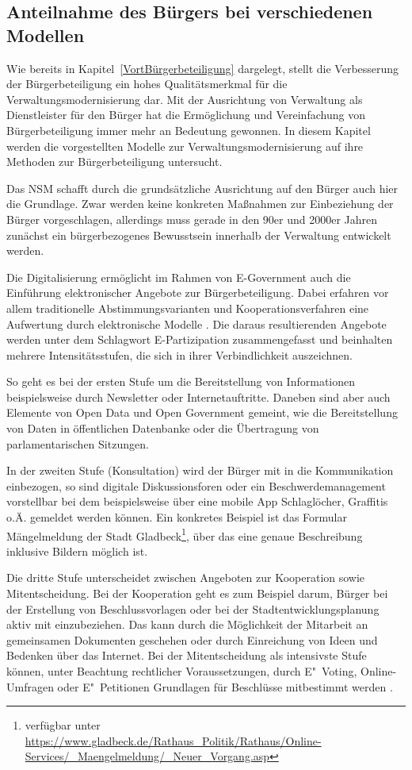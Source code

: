 \subsection{Anteilnahme des Bürgers bei verschiedenen Modellen}
Wie bereits in Kapitel~\ref{VortBürgerbeteiligung} dargelegt, stellt die Verbesserung der Bürgerbeteiligung ein hohes Qualitätsmerkmal für die Verwaltungsmodernisierung dar.
Mit der Ausrichtung von Verwaltung als Dienstleister für den Bürger hat die Ermöglichung und Vereinfachung von Bürgerbeteiligung immer mehr an Bedeutung gewonnen.
In diesem Kapitel werden die vorgestellten Modelle zur Verwaltungsmodernisierung auf ihre Methoden zur Bürgerbeteiligung untersucht.

Das NSM schafft durch die grundsätzliche Ausrichtung auf den Bürger auch hier die Grundlage.
Zwar werden keine konkreten Maßnahmen zur Einbeziehung der Bürger vorgeschlagen, allerdings muss gerade in den 90er und 2000er Jahren zunächst ein bürgerbezogenes Bewusstsein innerhalb der Verwaltung entwickelt werden.

Die Digitalisierung ermöglicht im Rahmen von E-Government auch die Einführung elektronischer Angebote zur Bürgerbeteiligung.
Dabei erfahren vor allem traditionelle Abstimmungsvarianten und Kooperationsverfahren eine Aufwertung durch elektronische Modelle \citep[][]{Leitner2018}.
Die daraus resultierenden Angebote werden unter dem Schlagwort E-Partizipation zusammengefasst und beinhalten mehrere Intensitätsstufen, die sich in ihrer Verbindlichkeit auszeichnen.

So geht es bei der ersten Stufe um die Bereitstellung von Informationen beispielsweise durch Newsletter oder Internetauftritte. 
Daneben sind aber auch Elemente von Open Data und Open Government gemeint, wie die Bereitstellung von Daten in öffentlichen Datenbanke oder die Übertragung von parlamentarischen Sitzungen.

In der zweiten Stufe (Konsultation) wird der Bürger mit in die Kommunikation einbezogen, so sind digitale Diskussionsforen oder ein Beschwerdemanagement vorstellbar bei dem beispielsweise über eine mobile App Schlaglöcher, Graffitis o.Ä. gemeldet werden können.
Ein konkretes Beispiel ist das Formular \glqq{}Mängelmeldung\grqq{} der Stadt Gladbeck\footnote{verfügbar unter\\ \url{https://www.gladbeck.de/Rathaus_Politik/Rathaus/Online-Services/_Maengelmeldung/_Neuer_Vorgang.asp}}, über das eine genaue Beschreibung inklusive Bildern möglich ist.

Die dritte Stufe unterscheidet zwischen Angeboten zur Kooperation sowie Mitentscheidung.
Bei der Kooperation geht es zum Beispiel darum, Bürger bei der Erstellung von Beschlussvorlagen oder bei der Stadtentwicklungsplanung aktiv mit einzubeziehen.
Das kann durch die Möglichkeit der Mitarbeit an gemeinsamen Dokumenten geschehen oder durch Einreichung von Ideen und Bedenken über das Internet. 
Bei der Mitentscheidung als intensivste Stufe können, unter Beachtung rechtlicher Voraussetzungen, durch E"~Voting, Online-Umfragen oder E"~Petitionen Grundlagen für Beschlüsse mitbestimmt werden \citep[vgl.][]{Leitner2018}.

